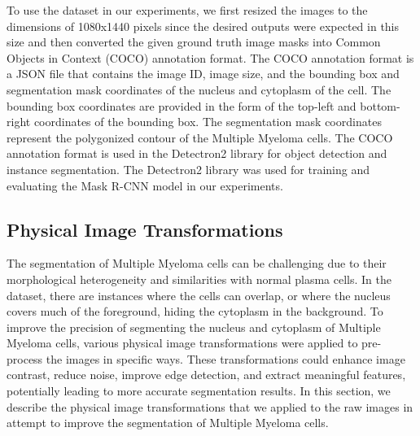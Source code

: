 \documentclass{article}
\begin{document}
To use the dataset in our experiments, we first resized the images to the dimensions of 1080x1440 pixels since the desired outputs were expected in this size and then converted the given ground truth image masks into Common Objects in Context (COCO) annotation format. The COCO annotation format is a JSON file that contains the image ID, image size, and the bounding box and segmentation mask coordinates of the nucleus and cytoplasm of the cell. The bounding box coordinates are provided in the form of the top-left and bottom-right coordinates of the bounding box. The segmentation mask coordinates represent the polygonized contour of the Multiple Myeloma cells. The COCO annotation format is used in the Detectron2 library for object detection and instance segmentation. The Detectron2 library was used for training and evaluating the Mask R-CNN model in our experiments.

\subsection{Physical Image Transformations}

The segmentation of Multiple Myeloma cells can be challenging due to their morphological heterogeneity and similarities with normal plasma cells. In the dataset, there are instances where the cells can overlap, or where the nucleus covers much of the foreground, hiding the cytoplasm in the background. To improve the precision of segmenting the nucleus and cytoplasm of Multiple Myeloma cells, various physical image transformations were applied to pre-process the images in specific ways. These transformations could enhance image contrast, reduce noise, improve edge detection, and extract meaningful features, potentially leading to more accurate segmentation results. In this section, we describe the physical image transformations that we applied to the raw images in attempt to improve the segmentation of Multiple Myeloma cells.
\end{document}
